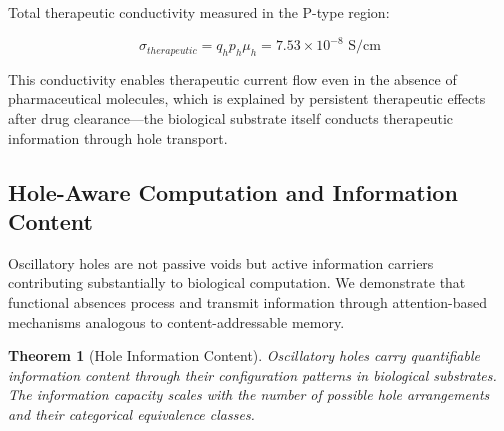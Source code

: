 \documentclass{article}
\newtheorem{theorem}{Theorem}[section]
\theoremstyle{definition}
\theoremstyle{remark}
\begin{document}
Total therapeutic conductivity measured in the P-type region:

\begin{equation}
\sigma_{therapeutic} = q_h p_h \mu_h = 7.53 \times 10^{-8} \text{ S/cm}
\label{eq:measured_conductivity}
\end{equation}

This conductivity enables therapeutic current flow even in the absence of pharmaceutical molecules, which is explained by persistent therapeutic effects after drug clearance—the biological substrate itself conducts therapeutic information through hole transport.

\subsection{Hole-Aware Computation and Information Content}

Oscillatory holes are not passive voids but active information carriers contributing substantially to biological computation. We demonstrate that functional absences process and transmit information through attention-based mechanisms analogous to content-addressable memory.

\begin{theorem}[Hole Information Content]
Oscillatory holes carry quantifiable information content through their configuration patterns in biological substrates. The information capacity scales with the number of possible hole arrangements and their categorical equivalence classes.
\end{theorem}
\end{document}
